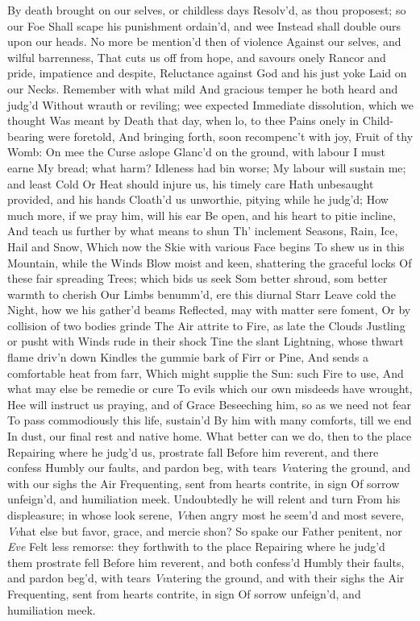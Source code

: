 \documentclass[11pt]{book}
\begin{document}
By death brought on our selves, or childless days 
Resolv'd, as thou proposest; so our Foe 
Shall scape his punishment ordain'd, and wee 
Instead shall double ours upon our heads. 
No more be mention'd then of violence 
Against our selves, and wilful barrenness, 
That cuts us off from hope, and savours onely 
Rancor and pride, impatience and despite, 
Reluctance against God and his just yoke 
Laid on our Necks.  Remember with what mild 
And gracious temper he both heard and judg'd 
Without wrauth or reviling; wee expected 
Immediate dissolution, which we thought 
Was meant by Death that day, when lo, to thee 
Pains onely in Child-bearing were foretold, 
And bringing forth, soon recompenc't with joy, 
Fruit of thy Womb: On mee the Curse aslope 
Glanc'd on the ground, with labour I must earne 
My bread; what harm?  Idleness had bin worse; 
My labour will sustain me; and least Cold 
Or Heat should injure us, his timely care 
Hath unbesaught provided, and his hands 
Cloath'd us unworthie, pitying while he judg'd; 
How much more, if we pray him, will his ear 
Be open, and his heart to pitie incline, 
And teach us further by what means to shun 
Th' inclement Seasons, Rain, Ice, Hail and Snow, 
Which now the Skie with various Face begins 
To shew us in this Mountain, while the Winds 
Blow moist and keen, shattering the graceful locks 
Of these fair spreading Trees; which bids us seek 
Som better shroud, som better warmth to cherish 
Our Limbs benumm'd, ere this diurnal Starr 
Leave cold the Night, how we his gather'd beams 
Reflected, may with matter sere foment, 
Or by collision of two bodies grinde 
The Air attrite to Fire, as late the Clouds 
Justling or pusht with Winds rude in their shock 
Tine the slant Lightning, whose thwart flame driv'n down 
Kindles the gummie bark of Firr or Pine, 
And sends a comfortable heat from farr, 
Which might supplie the Sun: such Fire to use, 
And what may else be remedie or cure 
To evils which our own misdeeds have wrought, 
Hee will instruct us praying, and of Grace 
Beseeching him, so as we need not fear 
To pass commodiously this life, sustain'd 
By him with many comforts, till we end 
In dust, our final rest and native home. 
What better can we do, then to the place 
Repairing where he judg'd us, prostrate fall 
Before him reverent, and there confess 
Humbly our faults, and pardon beg, with tears 
\textit{Vv}atering the ground, and with our sighs the Air 
Frequenting, sent from hearts contrite, in sign 
Of sorrow unfeign'd, and humiliation meek. 
Undoubtedly he will relent and turn 
From his displeasure; in whose look serene, 
\textit{Vv}hen angry most he seem'd and most severe, 
\textit{Vv}hat else but favor, grace, and mercie shon? 
\quad So spake our Father penitent, nor \textit{Eve} 
Felt less remorse: they forthwith to the place 
Repairing where he judg'd them prostrate fell 
Before him reverent, and both confess'd 
Humbly their faults, and pardon beg'd, with tears 
\textit{Vv}atering the ground, and with their sighs the Air 
Frequenting, sent from hearts contrite, in sign 
Of sorrow unfeign'd, and humiliation meek. 
\end{document}

